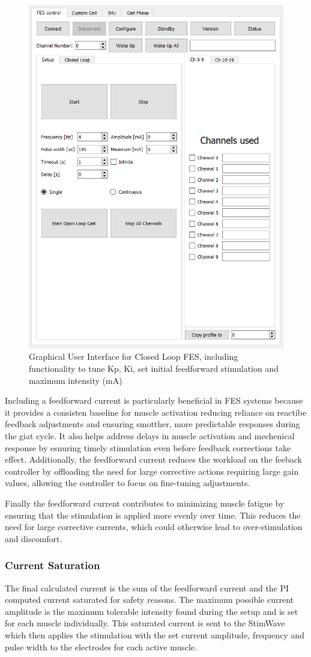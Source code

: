 \begin{figure}
    \centering
    \includegraphics[width=0.65\linewidth]{images/clgui.png}
    \caption{Graphical User Interface for Closed Loop FES, including functionality to tune Kp, Ki, set initial feedforward stimulation and maximum intensity (mA)}
    \label{fig:clsetup}
\end{figure}

Including a feedforward current is particularly beneficial in FES systems because it provides a consisten baseline for muscle activation reducing reliance on reactibe feedback adjustments and ensuring smotther, more predictable responses during the giat cycle. It also helps address delays in muscle activation and mechenical response by esnuring timely stimulation even before feedback corrections take effect. Additionally, the feedforward current reduces the workload on the feeback controller by offloading the need for large corrective actions requiring large gain values, allowing the controller to focus on fine-tuning adjustments.

Finally the feedforward current contributes to minimizing muscle fatigue by ensuring that the stimulation is applied more evenly over time. This reduces the need for large corrective currents, which could otherwise lead to over-stimulation and discomfort.

\subsubsection{Current Saturation}
The final calculated current is the sum of the feedforward current and the PI computed current saturated for safety reasons. The maximum possible current amplitude is the maximum tolerable intensity found during the setup and is set for each muscle individually. This saturated current is sent to the StimWave which then applies the stimulation with the set current amplitude, frequency and pulse width to the electrodes for each active muscle.

